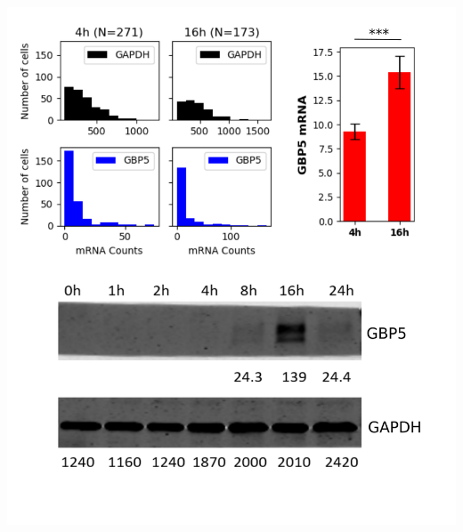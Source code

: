 \documentclass{beamer}					%
\begin{document}
\begin{frame}

\begin{center}
\includegraphics[width=1\textwidth]{Result.png}
\end{center}
\end{frame}
\end{document}
